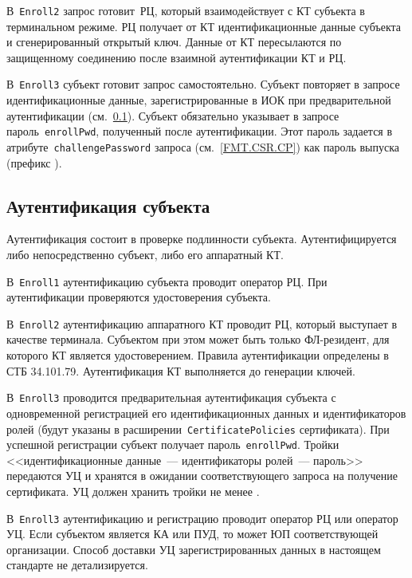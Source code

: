 В~\texttt{Enroll2} запрос готовит~РЦ, который взаимодействует с КТ 
субъекта в терминальном режиме. РЦ получает от КТ идентификационные 
данные субъекта и сгенерированный открытый ключ. Данные от КТ пересылаются 
по защищенному соединению после взаимной аутентификации КТ и РЦ. 

В~\texttt{Enroll3} субъект готовит запрос самостоятельно.
Субъект повторяет в запросе идентификационные данные, 
зарегистрированные в ИОК при предварительной аутентификации
(см.~\ref{PROCESSES.Enroll.Auth}).
%
Субъект обязательно указывает в запросе пароль~\texttt{enrollPwd}, 
полученный после аутентификации. Этот пароль задается в 
атрибуте~\texttt{challengePassword} запроса 
(см.~\ref{FMT.CSR.CP}) как пароль выпуска (префикс ).

\subsection{Аутентификация субъекта}\label{PROCESSES.Enroll.Auth}

Аутентификация состоит в проверке подлинности субъекта.
Аутентифицируется либо непосредственно субъект, либо его аппаратный КТ. 

В~\texttt{Enroll1} аутентификацию субъекта проводит оператор РЦ.
При аутентификации проверяются удостоверения субъекта. 

В~\texttt{Enroll2} аутентификацию аппаратного КТ проводит РЦ, который 
выступает в качестве терминала. Субъектом при этом может быть только 
ФЛ-резидент, для которого КТ является удостоверением. Правила аутентификации 
определены в СТБ 34.101.79. Аутентификация КТ выполняется до генерации 
ключей.

В~\texttt{Enroll3} проводится предварительная аутентификация
субъекта с одновременной регистрацией его идентификационных данных
и идентификаторов ролей (будут указаны в 
расширении~\texttt{CertificatePolicies} сертификата).   
При успешной регистрации субъект получает пароль~\texttt{enrollPwd}. 
Тройки <<идентификационные данные~--- идентификаторы ролей~--- пароль>> 
передаются УЦ и хранятся в ожидании соответствующего запроса на получение 
сертификата. УЦ должен хранить тройки не менее .

В~\texttt{Enroll3} аутентификацию и регистрацию проводит оператор РЦ или 
оператор УЦ. Если субъектом является КА или ПУД, то  
может ЮП соответствующей организации.
%
Способ доставки УЦ зарегистрированных данных в настоящем стандарте 
не детализируется.

